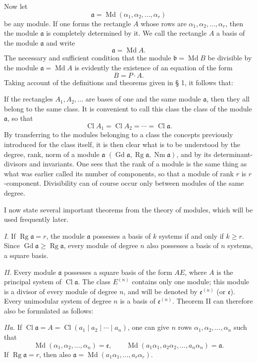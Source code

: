 \documentclass[11pt,a4paper]{article}
\newcommand{\Cl}{\operatorname{Cl}}
\newcommand{\Md}{\operatorname{Md}}
\newcommand{\Nm}{\operatorname{Nm}}
\newcommand{\Rg}{\operatorname{Rg}}
\newcommand{\Gd}{\operatorname{Gd}}
\begin{document}
Now let
\[
 \mathfrak a=\Md(\alpha_1,\alpha_2,\ldots,\alpha_r)
\]
be any module. If one forms the rectangle $A$ whose rows are $\alpha_1,\alpha_2,\ldots,\alpha_r$, then the module $\mathfrak a$ is completely determined by it. We call the rectangle $A$ a basis of the module $\mathfrak a$ and write
\[
 \mathfrak a=\Md A.
\]
The necessary and sufficient condition that the module $\mathfrak b=\Md B$ be divisible by the module $\mathfrak a=\Md A$ is evidently the existence of an equation of the form
\[
 B=P\cdot A.
\]
Taking account of the definitions and theorems given in § 1, it follows that:

If the rectangles $A_1,A_2,\ldots$ are bases of one and the same module $\mathfrak a$, then they all belong to the same class. It is convenient to call this class the class of the module $\mathfrak a$, so that
\[
 \Cl A_1=\Cl A_2=\cdots=\Cl\mathfrak a.
\]
By transferring to the modules belonging to a class the concepts previously introduced for the class itself, it is then clear what is to be understood by the degree, rank, norm of a module $\mathfrak a$ $(\Gd\mathfrak a,\Rg\mathfrak a,\Nm\mathfrak a)$, and by its determinant-divisors and invariants. One sees that the rank of a module is the same thing as what was earlier called its number of components, so that a module of rank $r$ is $r$-component. Divisibility can of course occur only between modules of the same degree.

I now state several important theorems from the theory of modules, which will be used frequently later.

\emph{I.} If $\Rg\mathfrak a=r$, the module $\mathfrak a$ possesses a basis of $k$ systems if and only if $k\ge r$. Since $\Gd\mathfrak a\ge\Rg\mathfrak a$, every module of degree $n$ also possesses a basis of $n$ systems, a square basis.

\emph{II.} Every module $\mathfrak a$ possesses a square basis of the form $AE$, where $A$ is the principal system of $\Cl\mathfrak a$. The class $E^{(n)}$ contains only one module; this module is a divisor of every module of degree $n$, and will be denoted by $\mathfrak e^{(n)}$ (or $\mathfrak e$). Every unimodular system of degree $n$ is a basis of $\mathfrak e^{(n)}$. Theorem II can therefore also be formulated as follows:

\emph{IIa.} If $\Cl\mathfrak a=A=\Cl(a_1\mid a_2\mid\cdots\mid a_n)$, one can give $n$ rows $\alpha_1,\alpha_2,\ldots,\alpha_n$ such that
\[
 \Md(\alpha_1,\alpha_2,\ldots,\alpha_n)=\mathfrak e,
 \qquad
 \Md(a_1\alpha_1,a_2\alpha_2,\ldots,a_n\alpha_n)=\mathfrak a.
\]
If $\Rg\mathfrak a=r$, then also $\mathfrak a=\Md(a_1\alpha_1,\ldots,a_r\alpha_r)$.
\end{document}
